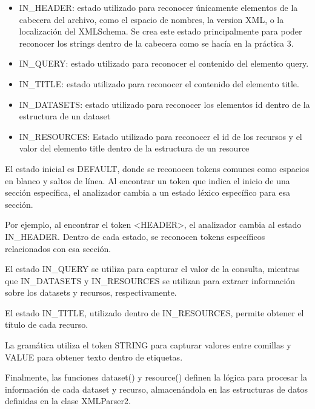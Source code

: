 \begin{itemize}
    \item IN\_HEADER: estado utilizado para reconocer únicamente elementos de la cabecera del archivo, como el espacio de nombres, la version XML, o la localización del XMLSchema. Se crea este estado principalmente para poder reconocer los strings dentro de la cabecera como se hacía en la práctica 3.
    \item IN\_QUERY: estado utilizado para reconocer el contenido del elemento query.
    \item IN\_TITLE: estado utilizado para reconocer el contenido del elemento title.
    \item IN\_DATASETS: estado utilizado para reconocer los elementos id dentro de la estructura de un dataset
    \item IN\_RESOURCES: Estado utilizado para reconocer el id de los recursos y el valor del elemento title dentro de la estructura de un resource
\end{itemize}


El estado inicial es DEFAULT, donde se reconocen tokens comunes como espacios en blanco y saltos de línea. Al encontrar un token que indica el inicio de una sección específica, el analizador cambia a un estado léxico específico para esa sección.

Por ejemplo, al encontrar el token <HEADER>, el analizador cambia al estado IN\_HEADER. Dentro de cada estado, se reconocen tokens específicos relacionados con esa sección.

El estado IN\_QUERY se utiliza para capturar el valor de la consulta, mientras que IN\_DATASETS y IN\_RESOURCES se utilizan para extraer información sobre los datasets y recursos, respectivamente.

El estado IN\_TITLE, utilizado dentro de IN\_RESOURCES, permite obtener el título de cada recurso.

La gramática utiliza el token STRING para capturar valores entre comillas y VALUE para obtener texto dentro de etiquetas.

Finalmente, las funciones dataset() y resource() definen la lógica para procesar la información de cada dataset y recurso, almacenándola en las estructuras de datos definidas en la clase XMLParser2.

